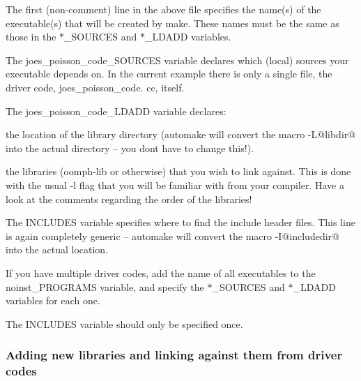\begin{DoxyEnumerate}
\begin{DoxyItemize}
\item The first (non-\/comment) line in the above file specifies the name(s) of the executable(s) that will be created by make. These names must be the same as those in the {\ttfamily $\ast$\+\_\+\+S\+O\+U\+R\+C\+ES} and {\ttfamily $\ast$\+\_\+\+L\+D\+A\+DD} variables. ~\newline
~\newline

\item The {\ttfamily joes\+\_\+poisson\+\_\+code\+\_\+\+S\+O\+U\+R\+C\+ES} variable declares which (local) sources your executable depends on. In the current example there is only a single file, the driver code, {\ttfamily joes\+\_\+poisson\+\_\+code}. {\ttfamily cc}, itself. ~\newline
~\newline

\item The {\ttfamily joes\+\_\+poisson\+\_\+code\+\_\+\+L\+D\+A\+DD} variable declares\+:
\begin{DoxyItemize}
\item the location of the library directory (automake will convert the macro {\ttfamily -\/L@libdir@} into the actual directory -- you don\textquotesingle{}t have to change this!).
\item the libraries ({\ttfamily oomph-\/lib} or otherwise) that you wish to link against. This is done with the usual {\ttfamily -\/l} flag that you will be familiar with from your compiler. Have a look at the comments regarding the order of the libraries! ~\newline
~\newline

\end{DoxyItemize}
\item The {\ttfamily I\+N\+C\+L\+U\+D\+ES} variable specifies where to find the include header files. This line is again completely generic -- automake will convert the macro {\ttfamily -\/I@includedir@} into the actual location. ~\newline
~\newline

\item If you have multiple driver codes, add the name of all executables to the {\ttfamily noinst\+\_\+\+P\+R\+O\+G\+R\+A\+MS} variable, and specify the {\ttfamily $\ast$\+\_\+\+S\+O\+U\+R\+C\+ES} and {\ttfamily $\ast$\+\_\+\+L\+D\+A\+DD} variables for each one. ~\newline
~\newline

\item The {\ttfamily I\+N\+C\+L\+U\+D\+ES} variable should only be specified once.
\end{DoxyItemize}
\end{DoxyEnumerate}\hypertarget{index_add_src}{}\subsubsection{Adding new libraries and linking against them from driver codes}\label{index_add_src}
